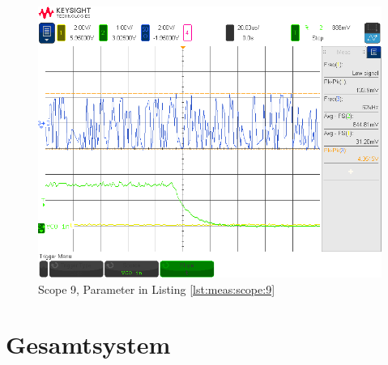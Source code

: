 \begin{figure}[h!tb]
    \centering
    \includegraphics[width=1\textwidth, trim=0mm 21mm 0mm 11mm, clip]{images/scopeShots/scope_9b.png}
    \caption{Scope 9, Parameter in Listing \ref{lst:meas:scope:9}}
    \label{fig:meas:scope:9}
\end{figure}


\section{Gesamtsystem}
\label{sec:validierung:total}
